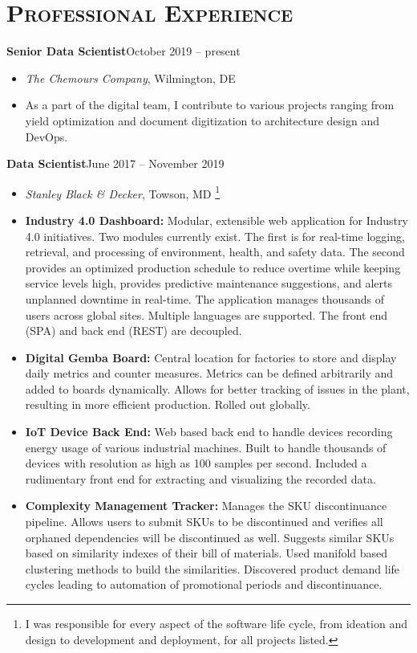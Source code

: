 \documentclass[10pt]{article}
\begin{document}
\section*{\textsc{Professional Experience}}
\textbf{Senior Data Scientist}\hfill October 2019 -- present
\begin{itemize}
    \item[] \textit{The Chemours Company}, Wilmington, DE
    \item[] As a part of the digital team, I contribute to various projects ranging from yield optimization and document digitization to architecture design and DevOps.
\end{itemize}
\textbf{Data Scientist}\hfill June 2017 -- November 2019
\begin{itemize}
    \item[] \textit{Stanley Black \& Decker}, Towson, MD \footnote{I was responsible for every aspect of the software life cycle, from ideation and design to development and deployment, for all projects listed.}
    \item \textbf{Industry 4.0 Dashboard:} Modular, extensible web application for Industry 4.0 initiatives. Two modules currently exist. The first is for real-time logging, retrieval, and processing of environment, health, and safety data. The second provides an optimized production schedule to reduce overtime while keeping service levels high, provides predictive maintenance suggestions, and alerts unplanned downtime in real-time. The application manages thousands of users across global sites. Multiple languages are supported. The front end (SPA) and back end (REST) are decoupled.
    \item \textbf{Digital Gemba Board:} Central location for factories to store and display daily metrics and counter measures. Metrics can be defined arbitrarily and added to boards dynamically. Allows for better tracking of issues in the plant, resulting in more efficient production. Rolled out globally.
    \item \textbf{IoT Device Back End:} Web based back end to handle devices recording energy usage of various industrial machines. Built to handle thousands of devices with resolution as high as 100 samples per second. Included a rudimentary front end for extracting and visualizing the recorded data.
    \iffalse
    \item \textbf{Computer Vision Safety Assistant:} Assists operators when assembling progressive stamp die blocks. Uses a convolutional neural network to classify blocks as properly configured or not. Allows an operator to provide training examples to help annotate images. Resulted in a vast reduction in cost by informing the operator before continuing.
    \fi
    \item \textbf{Complexity Management Tracker:} Manages the SKU discontinuance pipeline. Allows users to submit SKUs to be discontinued and verifies all orphaned dependencies will be discontinued as well. Suggests similar SKUs based on similarity indexes of their bill of materials. Used manifold based clustering methods to build the similarities. Discovered product demand life cycles leading to automation of promotional periods and discontinuance.
\end{itemize}
\end{document}
